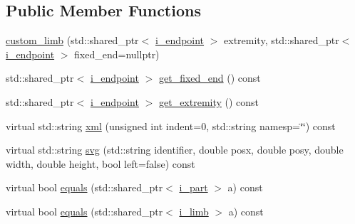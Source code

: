 \subsection*{Public Member Functions}
\begin{DoxyCompactItemize}
\item 
\hyperlink{classmae_1_1fl_1_1laban_1_1ps_1_1custom__limb_a9c2c37062ecae3f45015afb5c8c7611a}{custom\-\_\-limb} (std\-::shared\-\_\-ptr$<$ \hyperlink{classmae_1_1fl_1_1laban_1_1ps_1_1i__endpoint}{i\-\_\-endpoint} $>$ extremity, std\-::shared\-\_\-ptr$<$ \hyperlink{classmae_1_1fl_1_1laban_1_1ps_1_1i__endpoint}{i\-\_\-endpoint} $>$ fixed\-\_\-end=nullptr)
\item 
std\-::shared\-\_\-ptr$<$ \hyperlink{classmae_1_1fl_1_1laban_1_1ps_1_1i__endpoint}{i\-\_\-endpoint} $>$ \hyperlink{classmae_1_1fl_1_1laban_1_1ps_1_1custom__limb_a5714efb1c984f1b9a4b6d086627266c9}{get\-\_\-fixed\-\_\-end} () const 
\item 
std\-::shared\-\_\-ptr$<$ \hyperlink{classmae_1_1fl_1_1laban_1_1ps_1_1i__endpoint}{i\-\_\-endpoint} $>$ \hyperlink{classmae_1_1fl_1_1laban_1_1ps_1_1custom__limb_ade139b5ffa96d4b61f40fcea26e3d200}{get\-\_\-extremity} () const 
\item 
virtual std\-::string \hyperlink{classmae_1_1fl_1_1laban_1_1ps_1_1custom__limb_a2622dd693ce2f662a4802025b42f1e64}{xml} (unsigned int indent=0, std\-::string namesp=\char`\"{}\char`\"{}) const 
\item 
virtual std\-::string \hyperlink{classmae_1_1fl_1_1laban_1_1ps_1_1custom__limb_aa002dfaca3b1f073f67a85572095b504}{svg} (std\-::string identifier, double posx, double posy, double width, double height, bool left=false) const 
\item 
virtual bool \hyperlink{classmae_1_1fl_1_1laban_1_1ps_1_1custom__limb_aea87a1c04a4a8fde3ef80862690b0318}{equals} (std\-::shared\-\_\-ptr$<$ \hyperlink{classmae_1_1fl_1_1laban_1_1ps_1_1i__part}{i\-\_\-part} $>$ a) const 
\item 
virtual bool \hyperlink{classmae_1_1fl_1_1laban_1_1ps_1_1custom__limb_ab152826ff0de843c52695807715a6c71}{equals} (std\-::shared\-\_\-ptr$<$ \hyperlink{classmae_1_1fl_1_1laban_1_1ps_1_1i__limb}{i\-\_\-limb} $>$ a) const 
\end{DoxyCompactItemize}


